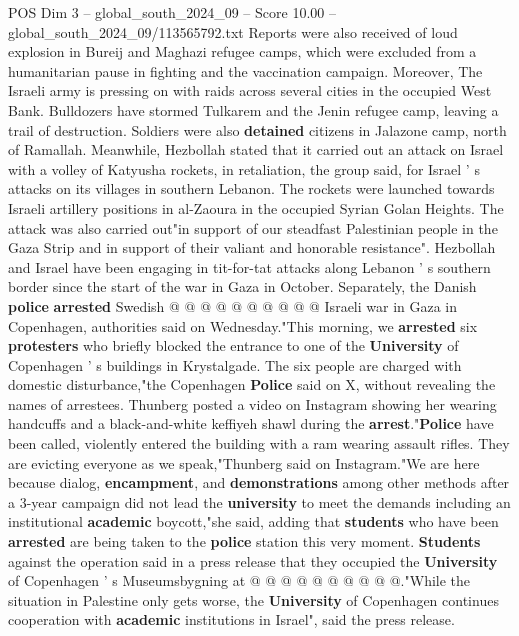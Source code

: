 \begin{textsample}{POS Dim 3 – global\_south\_2024\_09 – Score 10.00 – global\_south\_2024\_09/113565792.txt}  \label{ex:f3_pos_320}
Reports were also received of loud explosion in Bureij and Maghazi refugee camps, which were excluded from a humanitarian pause in fighting and the vaccination campaign.
Moreover, The Israeli army is pressing on with raids across several cities in the occupied West Bank.
Bulldozers have stormed Tulkarem and the Jenin refugee camp, leaving a trail of destruction.
Soldiers were also \textbf{detained} citizens in Jalazone camp, north of Ramallah.
Meanwhile, Hezbollah stated that it carried out an attack on Israel with a volley of Katyusha rockets, in retaliation, the group said, for Israel ' s attacks on its villages in southern Lebanon.
The rockets were launched towards Israeli artillery positions in al-Zaoura in the occupied Syrian Golan Heights.
The attack was also carried out"in support of our steadfast Palestinian people in the Gaza Strip and in support of their valiant and honorable resistance".
Hezbollah and Israel have been engaging in tit-for-tat attacks along Lebanon ' s southern border since the start of the war in Gaza in October.
Separately, the Danish \textbf{police} \textbf{arrested} Swedish @ @ @ @ @ @ @ @ @ @ Israeli war in Gaza in Copenhagen, authorities said on Wednesday."This morning, we \textbf{arrested} six \textbf{protesters} who briefly blocked the entrance to one of the \textbf{University} of Copenhagen ' s buildings in Krystalgade.
The six people are charged with domestic disturbance,"the Copenhagen \textbf{Police} said on X, without revealing the names of arrestees.
Thunberg posted a video on Instagram showing her wearing handcuffs and a black-and-white keffiyeh shawl during the \textbf{arrest}."\textbf{Police} have been called, violently entered the building with a ram wearing assault rifles.
They are evicting everyone as we speak,"Thunberg said on Instagram."We are here because dialog, \textbf{encampment}, and \textbf{demonstrations} among other methods after a 3-year campaign did not lead the \textbf{university} to meet the demands including an institutional \textbf{academic} boycott,"she said, adding that \textbf{students} who have been \textbf{arrested} are being taken to the \textbf{police} station this very moment. \textbf{Students} against the operation said in a press release that they occupied the \textbf{University} of Copenhagen ' s Museumsbygning at @ @ @ @ @ @ @ @ @ @."While the situation in Palestine only gets worse, the \textbf{University} of Copenhagen continues cooperation with \textbf{academic} institutions in Israel", said the press release.

\end{textsample}
